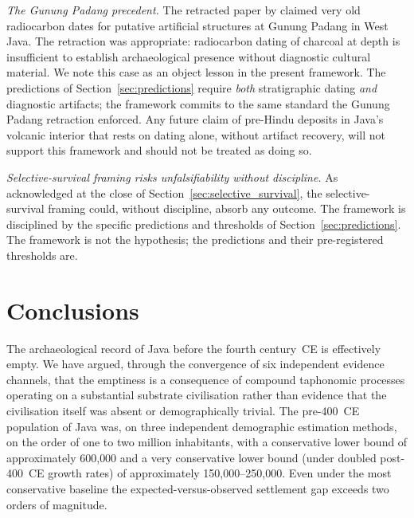 \documentclass[12pt,a4paper]{article}
\begin{document}
\textit{The Gunung Padang precedent.} The retracted paper by \citet{natawidjaja2023} claimed very old radiocarbon dates for putative artificial structures at Gunung Padang in West Java. The retraction was appropriate: radiocarbon dating of charcoal at depth is insufficient to establish archaeological presence without diagnostic cultural material. We note this case as an object lesson in the present framework. The predictions of Section~\ref{sec:predictions} require \textit{both} stratigraphic dating \textit{and} diagnostic artifacts; the framework commits to the same standard the Gunung Padang retraction enforced. Any future claim of pre-Hindu deposits in Java's volcanic interior that rests on dating alone, without artifact recovery, will not support this framework and should not be treated as doing so.

\textit{Selective-survival framing risks unfalsifiability without discipline.} As acknowledged at the close of Section~\ref{sec:selective_survival}, the selective-survival framing could, without discipline, absorb any outcome. The framework is disciplined by the specific predictions and thresholds of Section~\ref{sec:predictions}. The framework is not the hypothesis; the predictions and their pre-registered thresholds are.


\section{Conclusions}
\label{sec:conclusion}

The archaeological record of Java before the fourth century~CE is effectively empty. We have argued, through the convergence of six independent evidence channels, that the emptiness is a consequence of compound taphonomic processes operating on a substantial substrate civilisation rather than evidence that the civilisation itself was absent or demographically trivial. The pre-400~CE population of Java was, on three independent demographic estimation methods, on the order of one to two million inhabitants, with a conservative lower bound of approximately 600{,}000 and a very conservative lower bound (under doubled post-400~CE growth rates) of approximately 150{,}000--250{,}000. Even under the most conservative baseline the expected-versus-observed settlement gap exceeds two orders of magnitude.
\end{document}
